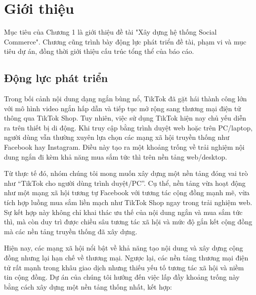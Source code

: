 \chapter{Giới thiệu}
Mục tiêu của Chương 1 là giới thiệu đề tài "Xây dựng hệ thống Social Commerce". Chương cũng trình bày động lực phát triển đề tài, phạm vi và mục tiêu dự án, đồng thời giới thiệu cấu trúc tổng thể của báo cáo.

\section{Động lực phát triển}
Trong bối cảnh nội dung dạng ngắn bùng nổ, TikTok đã gặt hái thành công lớn với mô hình video ngắn hấp dẫn và tiếp tục mở rộng sang thương mại điện tử thông qua TikTok Shop. Tuy nhiên, việc sử dụng TikTok hiện nay chủ yếu diễn ra trên thiết bị di động. Khi truy cập bằng trình duyệt web hoặc trên PC/laptop, người dùng vẫn thường xuyên lựa chọn các mạng xã hội truyền thống như Facebook hay Instagram. Điều này tạo ra một khoảng trống về trải nghiệm nội dung ngắn đi kèm khả năng mua sắm tức thì trên nền tảng web/desktop.

Từ thực tế đó, nhóm chúng tôi mong muốn xây dựng một nền tảng đóng vai trò như “TikTok cho người dùng trình duyệt/PC”. Cụ thể, nền tảng vừa hoạt động như một mạng xã hội tương tự Facebook với tương tác cộng đồng mạnh mẽ, vừa tích hợp luồng mua sắm liền mạch như TikTok Shop ngay trong trải nghiệm web. Sự kết hợp này không chỉ khai thác ưu thế của nội dung ngắn và mua sắm tức thì, mà còn duy trì được chiều sâu tương tác xã hội và mức độ gắn kết cộng đồng mà các nền tảng truyền thống đã xây dựng.

Hiện nay, các mạng xã hội nổi bật về khả năng tạo nội dung và xây dựng cộng đồng nhưng lại hạn chế về thương mại. Ngược lại, các nền tảng thương mại điện tử rất mạnh trong khâu giao dịch nhưng thiếu yếu tố tương tác xã hội và niềm tin cộng đồng. Dự án của chúng tôi hướng đến việc lấp đầy khoảng trống này bằng cách xây dựng một nền tảng thống nhất, kết hợp:

